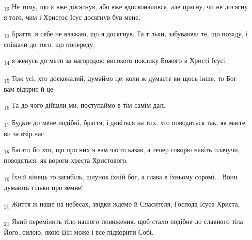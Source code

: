 \begin{tcolorbox}
\textsubscript{12} Не тому, що я вже досягнув, або вже вдосконалився, але прагну, чи не досягну я того, чим і Христос Ісус досягнув був мене.
\end{tcolorbox}
\begin{tcolorbox}
\textsubscript{13} Браття, я себе не вважаю, що я досягнув. Та тільки, забуваючи те, що позаду, і спішачи до того, що попереду,
\end{tcolorbox}
\begin{tcolorbox}
\textsubscript{14} я женусь до мети за нагородою високого поклику Божого в Христі Ісусі.
\end{tcolorbox}
\begin{tcolorbox}
\textsubscript{15} Тож усі, хто досконалий, думаймо це; коли ж думаєте ви щось інше, то Бог вам відкриє й це.
\end{tcolorbox}
\begin{tcolorbox}
\textsubscript{16} Та до чого дійшли ми, поступаймо в тім самім далі.
\end{tcolorbox}
\begin{tcolorbox}
\textsubscript{17} Будьте до мене подібні, браття, і дивіться на тих, хто поводиться так, як маєте ви за взір нас.
\end{tcolorbox}
\begin{tcolorbox}
\textsubscript{18} Багато бо хто, що про них я вам часто казав, а тепер говорю навіть плачучи, поводяться, як вороги хреста Христового.
\end{tcolorbox}
\begin{tcolorbox}
\textsubscript{19} Їхній кінець то загибіль, шлунок їхній бог, а слава в їхньому соромі... Вони думають тільки про земне!
\end{tcolorbox}
\begin{tcolorbox}
\textsubscript{20} Життя ж наше на небесах, звідки ждемо й Спасителя, Господа Ісуса Христа,
\end{tcolorbox}
\begin{tcolorbox}
\textsubscript{21} Який перемінить тіло нашого пониження, щоб стало подібне до славного тіла Його, силою, якою Він може і все підкорити Собі.
\end{tcolorbox}

